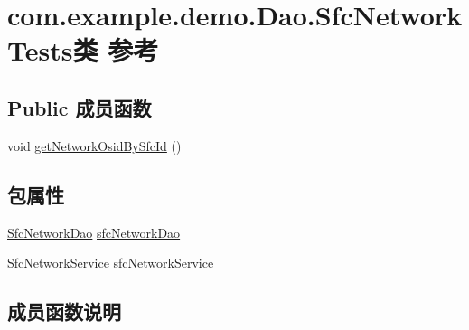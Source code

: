 \hypertarget{classcom_1_1example_1_1demo_1_1_dao_1_1_sfc_network_tests}{}\section{com.\+example.\+demo.\+Dao.\+Sfc\+Network\+Tests类 参考}
\label{classcom_1_1example_1_1demo_1_1_dao_1_1_sfc_network_tests}
\subsection*{Public 成员函数}
\begin{DoxyCompactItemize}
\item 
void \mbox{\hyperlink{classcom_1_1example_1_1demo_1_1_dao_1_1_sfc_network_tests_afcee0cc4e243519d783d8c62845f8691}{get\+Network\+Osid\+By\+Sfc\+Id}} ()
\end{DoxyCompactItemize}
\subsection*{包属性}
\begin{DoxyCompactItemize}
\item 
\mbox{\hyperlink{interfacecom_1_1example_1_1demo_1_1dao_1_1_sfc_network_dao}{Sfc\+Network\+Dao}} \mbox{\hyperlink{classcom_1_1example_1_1demo_1_1_dao_1_1_sfc_network_tests_a2b56954b46078334dcae67e43880b0b1}{sfc\+Network\+Dao}}
\item 
\mbox{\hyperlink{classcom_1_1example_1_1demo_1_1service_1_1_sfc_network_service}{Sfc\+Network\+Service}} \mbox{\hyperlink{classcom_1_1example_1_1demo_1_1_dao_1_1_sfc_network_tests_ab72070f5d32a3163e054c7ea79de55c3}{sfc\+Network\+Service}}
\end{DoxyCompactItemize}


\subsection{成员函数说明}
\mbox{\label{classcom_1_1example_1_1demo_1_1_dao_1_1_sfc_network_tests_afcee0cc4e243519d783d8c62845f8691}} 
